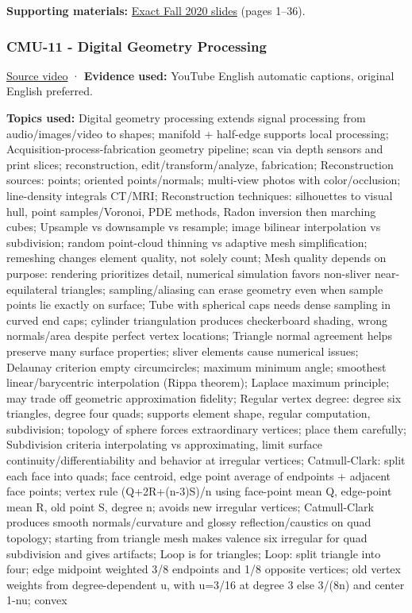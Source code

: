 \textbf{Supporting materials:} \href{https://15462.courses.cs.cmu.edu/fall2020content/lectures/10_meshes/10_meshes_slides.pdf}{Exact Fall 2020 slides} (pages 1--36).

\subsubsection{CMU-11 - Digital Geometry Processing}\label{04-visual-computing-ii-ch036-cmu-11---digital-geometry-processing}

\hypertarget{04-visual-computing-ii-ch036-cmu-11---digital-geometry-processing}{}

\href{https://www.youtube.com/watch?v=BwpEoZYcrwY}{Source video} · \textbf{Evidence used:} YouTube English automatic captions, original English preferred.

\textbf{Topics used:} Digital geometry processing extends signal processing from audio/images/video to shapes; manifold + half-edge supports local processing; Acquisition-process-fabrication geometry pipeline; scan via depth sensors and print slices; reconstruction, edit/transform/analyze, fabrication; Reconstruction sources: points; oriented points/normals; multi-view photos with color/occlusion; line-density integrals CT/MRI; Reconstruction techniques: silhouettes to visual hull, point samples/Voronoi, PDE methods, Radon inversion then marching cubes; Upsample vs downsample vs resample; image bilinear interpolation vs subdivision; random point-cloud thinning vs adaptive mesh simplification; remeshing changes element quality, not solely count; Mesh quality depends on purpose: rendering prioritizes detail, numerical simulation favors non-sliver near-equilateral triangles; sampling/aliasing can erase geometry even when sample points lie exactly on surface; Tube with spherical caps needs dense sampling in curved end caps; cylinder triangulation produces checkerboard shading, wrong normals/area despite perfect vertex locations; Triangle normal agreement helps preserve many surface properties; sliver elements cause numerical issues; Delaunay criterion empty circumcircles; maximum minimum angle; smoothest linear/barycentric interpolation (Rippa theorem); Laplace maximum principle; may trade off geometric approximation fidelity; Regular vertex degree: degree six triangles, degree four quads; supports element shape, regular computation, subdivision; topology of sphere forces extraordinary vertices; place them carefully; Subdivision criteria interpolating vs approximating, limit surface continuity/differentiability and behavior at irregular vertices; Catmull-Clark: split each face into quads; face centroid, edge point average of endpoints + adjacent face points; vertex rule (Q+2R+(n-3)S)/n using face-point mean Q, edge-point mean R, old point S, degree n; avoids new irregular vertices; Catmull-Clark produces smooth normals/curvature and glossy reflection/caustics on quad topology; starting from triangle mesh makes valence six irregular for quad subdivision and gives artifacts; Loop is for triangles; Loop: split triangle into four; edge midpoint weighted 3/8 endpoints and 1/8 opposite vertices; old vertex weights from degree-dependent u, with u=3/16 at degree 3 else 3/(8n) and center 1-nu; convex 